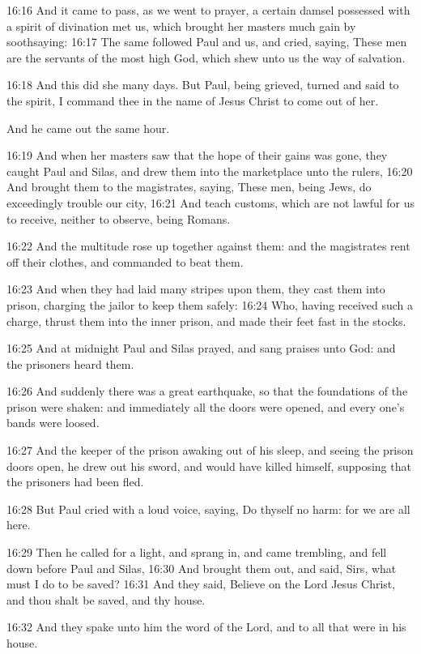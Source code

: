 16:16 And it came to pass, as we went to prayer, a certain damsel possessed with a spirit of divination met us, which brought her masters much gain by soothsaying: 16:17 The same followed Paul and us, and cried, saying, These men are the servants of the most high God, which shew unto us the way of salvation.

16:18 And this did she many days. But Paul, being grieved, turned and said to the spirit, I command thee in the name of Jesus Christ to come out of her.

And he came out the same hour.

16:19 And when her masters saw that the hope of their gains was gone, they caught Paul and Silas, and drew them into the marketplace unto the rulers, 16:20 And brought them to the magistrates, saying, These men, being Jews, do exceedingly trouble our city, 16:21 And teach customs, which are not lawful for us to receive, neither to observe, being Romans.

16:22 And the multitude rose up together against them: and the magistrates rent off their clothes, and commanded to beat them.

16:23 And when they had laid many stripes upon them, they cast them into prison, charging the jailor to keep them safely: 16:24 Who, having received such a charge, thrust them into the inner prison, and made their feet fast in the stocks.

16:25 And at midnight Paul and Silas prayed, and sang praises unto God: and the prisoners heard them.

16:26 And suddenly there was a great earthquake, so that the foundations of the prison were shaken: and immediately all the doors were opened, and every one's bands were loosed.

16:27 And the keeper of the prison awaking out of his sleep, and seeing the prison doors open, he drew out his sword, and would have killed himself, supposing that the prisoners had been fled.

16:28 But Paul cried with a loud voice, saying, Do thyself no harm: for we are all here.

16:29 Then he called for a light, and sprang in, and came trembling, and fell down before Paul and Silas, 16:30 And brought them out, and said, Sirs, what must I do to be saved?  16:31 And they said, Believe on the Lord Jesus Christ, and thou shalt be saved, and thy house.

16:32 And they spake unto him the word of the Lord, and to all that were in his house.

